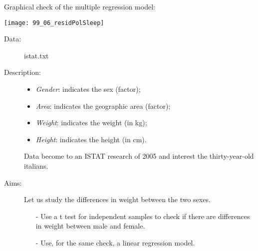 \begin{frame}
  Graphical check of the multiple regression model:\\
  \vspace{.1cm}
  \begin{center}
    \texttt{[image: 99\_06\_residPolSleep]}
  \end{center}
\end{frame}





\begin{frame}
  \begin{description}
    \item[Data: ]istat.txt \\ 
    \item[Description: ]
      \begin{footnotesize}
        \begin{itemize}
          \item \textit{Gender}: indicates the sex (factor);
          \item \textit{Area}: indicates the geographic area (factor);
          \item \textit{Weight}: indicates the weight (in kg);
          \item \textit{Height}: indicates the height (in cm).
        \end{itemize}
      \end{footnotesize}
      \begin{tiny}
        Data become to an ISTAT research of 2005 and interest the thirty-year-old italians.
      \end{tiny}
    \item[Aims: ]
      \begin{footnotesize}
        Let us study the differences in weight between the two sexes.
        \begin{itemize}
          \item[-] Use a t test for independent samples to check if there are differences in weight between male and female.  
          \item[-] Use, for the same check, a linear regression model.
        \end{itemize}
      \end{footnotesize}
  \end{description}
\end{frame}

